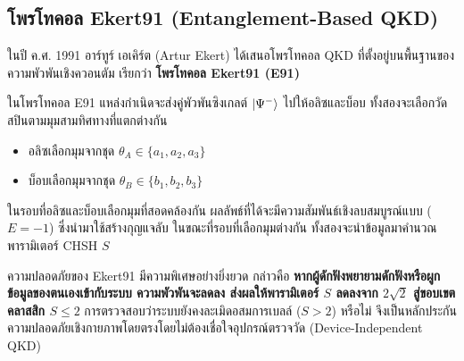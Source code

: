 \subsection{โพรโทคอล Ekert91 (Entanglement-Based QKD)}
ในปี ค.ศ. 1991 อาร์ทูร์ เอเคิร์ต (Artur Ekert) ได้เสนอโพรโทคอล QKD ที่ตั้งอยู่บนพื้นฐานของความพัวพันเชิงควอนตัม เรียกว่า \textbf{โพรโทคอล Ekert91 (E91)}

ในโพรโทคอล E91 แหล่งกำเนิดจะส่งคู่พัวพันซิงเกลต์ $\ket{\Psi^-}$ ไปให้อลิซและบ็อบ ทั้งสองจะเลือกวัดสปินตามมุมสามทิศทางที่แตกต่างกัน
\begin{itemize}
    \item อลิซเลือกมุมจากชุด $\theta_A \in \{a_1, a_2, a_3\}$
    \item บ็อบเลือกมุมจากชุด $\theta_B \in \{b_1, b_2, b_3\}$
\end{itemize}
ในรอบที่อลิซและบ็อบเลือกมุมที่สอดคล้องกัน ผลลัพธ์ที่ได้จะมีความสัมพันธ์เชิงลบสมบูรณ์แบบ ($E = -1$) ซึ่งนำมาใช้สร้างกุญแจลับ ในขณะที่รอบที่เลือกมุมต่างกัน ทั้งสองจะนำข้อมูลมาคำนวณพารามิเตอร์ CHSH $S$

ความปลอดภัยของ Ekert91 มีความพิเศษอย่างยิ่งยวด กล่าวคือ \textbf{หากผู้ดักฟังพยายามดักฟังหรือผูกข้อมูลของตนเองเข้ากับระบบ ความพัวพันจะลดลง ส่งผลให้พารามิเตอร์ $S$ ลดลงจาก $2\sqrt{2}$ สู่ขอบเขตคลาสสิก $S \le 2$} การตรวจสอบว่าระบบยังคงละเมิดอสมการเบลล์ ($S > 2$) หรือไม่ จึงเป็นหลักประกันความปลอดภัยเชิงกายภาพโดยตรงโดยไม่ต้องเชื่อใจอุปกรณ์ตรวจวัด (Device-Independent QKD)


